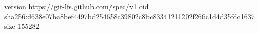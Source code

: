 version https://git-lfs.github.com/spec/v1
oid sha256:d638e07ba8bef4497bd254658c39802c8bc83341211202f266c1d4d35fdc1637
size 155282
